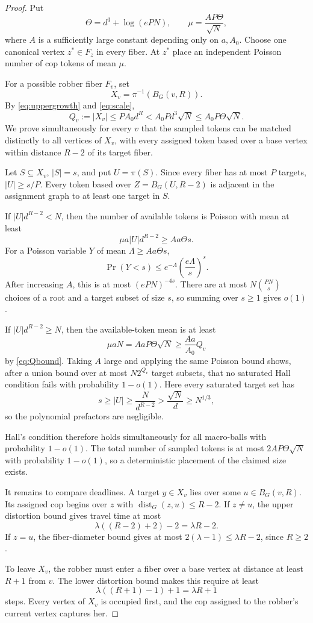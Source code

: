 \documentclass[11pt]{amsart}
\theoremstyle{definition}
\newcommand{\dist}{\operatorname{dist}}
\begin{document}
\begin{proof}
Put
\[
 \Theta=d^3+\log(ePN),
 \qquad
 \mu=\frac{AP\Theta}{\sqrt N},
\]
where $A$ is a sufficiently large constant depending only on $a,A_0$.
Choose one canonical vertex $z^*\in F_z$ in every fiber.  At $z^*$ place an
independent Poisson number of cop tokens of mean $\mu$.

For a possible robber fiber $F_v$, set
\[
 X_v=\pi^{-1}(B_G(v,R)).
\]
By \eqref{eq:uppergrowth} and \eqref{eq:scale},
\begin{equation}\label{eq:Qbound}
 Q_v:=|X_v|
 \le PA_0d^R
 <A_0Pd^3\sqrt N
 \le A_0P\Theta\sqrt N.
\end{equation}
We prove simultaneously for every $v$ that the sampled tokens can be matched
distinctly to all vertices of $X_v$, with every assigned token based over a
base vertex within distance $R-2$ of its target fiber.

Let $S\subseteq X_v$, $|S|=s$, and put $U=\pi(S)$.  Since every fiber has at
most $P$ targets, $|U|\ge s/P$.  Every token based over
$Z=B_G(U,R-2)$ is adjacent in the assignment graph to at least one target in
$S$.

If $|U|d^{R-2}<N$, then the number of available tokens is Poisson with mean
at least
\[
 \mu a|U|d^{R-2}\ge Aa\Theta s.
\]
For a Poisson variable $Y$ of mean $\Lambda\ge Aa\Theta s$,
\[
 \Pr(Y<s)\le e^{-\Lambda}\left(\frac{e\Lambda}{s}\right)^s.
\]
After increasing $A$, this is at most $(ePN)^{-4s}$.  There are at most
$N\binom{PN}{s}$ choices of a root and a target subset of size $s$, so summing
over $s\ge1$ gives $o(1)$.

If $|U|d^{R-2}\ge N$, then the available-token mean is at least
\[
 \mu aN=AaP\Theta\sqrt N
 \ge\frac{Aa}{A_0}Q_v
\]
by \eqref{eq:Qbound}.  Taking $A$ large and applying the same Poisson bound
shows, after a union bound over at most $N2^{Q_v}$ target subsets, that no
saturated Hall condition fails with probability $1-o(1)$.  Here every
saturated target set has
\[
 s\ge |U|\ge\frac{N}{d^{R-2}}>\frac{\sqrt N}{d}\ge N^{1/3},
\]
so the polynomial prefactors are negligible.

Hall's condition therefore holds simultaneously for all macro-balls with
probability $1-o(1)$.  The total number of sampled tokens is at most
$2AP\Theta\sqrt N$ with probability $1-o(1)$, so a deterministic placement of
the claimed size exists.

It remains to compare deadlines.  A target $y\in X_v$ lies over some
$u\in B_G(v,R)$.  Its assigned cop begins over $z$ with
$\dist_G(z,u)\le R-2$.  If $z\ne u$, the upper distortion bound gives travel
time at most
\[
 \lambda((R-2)+2)-2=\lambda R-2.
\]
If $z=u$, the fiber-diameter bound gives at most
$2(\lambda-1)\le\lambda R-2$, since $R\ge2$.

To leave $X_v$, the robber must enter a fiber over a base vertex at distance
at least $R+1$ from $v$.  The lower distortion bound makes this require at
least
\[
 \lambda((R+1)-1)+1=\lambda R+1
\]
steps.  Every vertex of $X_v$ is occupied first, and the cop assigned to the
robber's current vertex captures her.
\end{proof}
\end{document}
